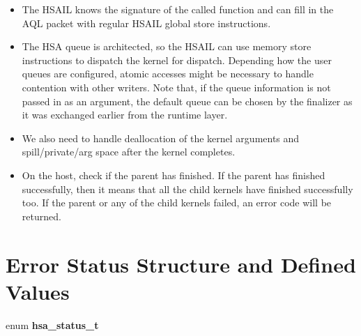 \documentclass{book}
\newcommand{\hsadef}[2]{\hypertarget{#1}{\textbf{#2}}}
\begin{document}
\begin{appendices}
\begin{itemize}
\item The HSAIL knows the signature of the called function
and can fill in the AQL packet with regular HSAIL global
store instructions.
\item The HSA queue is architected, so the HSAIL can use
memory store instructions to dispatch the kernel for dispatch.
Depending how the user queues are configured, atomic accesses might
be necessary to handle contention with other writers. Note that, if
the queue information is not passed in as an argument, the default
queue can be chosen by the finalizer as it was exchanged earlier
from the runtime layer.
\item We also need to handle deallocation of the kernel arguments
and spill/private/arg space after the kernel completes.
\item On the host, check if the parent has finished. If the parent
has finished successfully, then it means that all the child kernels
have finished successfully too. If the parent or any of the child
kernels failed, an error code will be returned.
\end{itemize}

\chapter{Error Status Structure and Defined Values}
\label{errstatus} \hypertarget{errstatus}{}
\makeatletter{}

\noindent\begin{tcolorbox}[nobeforeafter,arc=0mm,colframe=white,colback=lightgray,left=0mm]
enum \hsadef{group__ENU__status_1gad755322e7ff95456520e8abdbe90d225}{hsa\_status\_t}
\end{tcolorbox}



\end{appendices}
\end{document}
